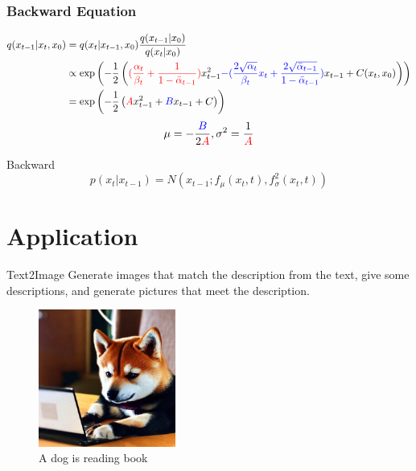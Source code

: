 \documentclass[aspectratio=169]{beamer}
\begin{document}
\begin{frame}
    \frametitle{Backward Equation}
    \begin{block}{}
        \begin{align*}
            q(x_{t-1} | x_t, x_0) & = q(x_t | x_{t-1}, x_0) \frac{q(x_{t-1}|x_0)}{q(x_t|x_0)} \\
                                  & \propto \exp\left(
            - \frac 12 \left(
            \textcolor{red} { (\frac{\alpha_t}{\beta_t}
                + \frac 1{1-\bar{\alpha}_{t-1}}) } x_{t-1}^2
            \textcolor{blue}{ - (\frac{2\sqrt{\alpha_t}}{\beta_t}x_t
                + \frac{2\sqrt{\bar{\alpha}_{t-1}}} {1-\bar{\alpha}_{t-1}} )} x_{t-1}
            +C(x_t, x_0) \right)
            \right)                                                                           \\
                                  & = \exp \left ( -\frac12
            \left ( \textcolor{red}{A} x_{t-1}^2 + \textcolor{blue}{B} x_{t-1} + C \right )
            \right )
        \end{align*}
        \begin{equation}
            \mu = -\frac{\textcolor{blue}{B}}{2\textcolor{red}{A}}, \sigma^2 = \frac {1}{\textcolor{red}{A}}
        \end{equation}
    \end{block}
    \begin{block}{Backward}
        \begin{equation}
            p(x_t|x_{t-1}) = N(x_{t-1};f_\mu(x_t, t),f_\sigma^2(x_t, t))
        \end{equation}
    \end{block}
\end{frame}

\section{Application}

\begin{frame}{Text2Image}
    Generate images that match the description from the text, give some descriptions, and generate pictures that meet the description.
    \begin{figure}
        \centering
        \includegraphics[height=4.5cm]{../pic/dog-is-reading.png}
        \caption{A dog is reading book}
    \end{figure}
\end{frame}
\end{document}
